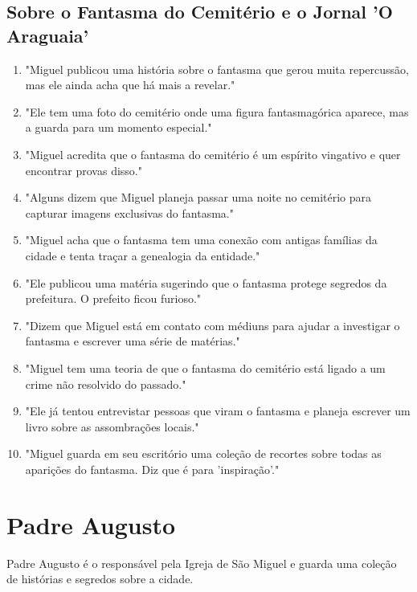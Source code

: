 \subsection*{Sobre o Fantasma do Cemitério e o Jornal 'O Araguaia'}
\begin{enumerate}
    \item "Miguel publicou uma história sobre o fantasma que gerou muita repercussão, mas ele ainda acha que há mais a revelar."
    \item "Ele tem uma foto do cemitério onde uma figura fantasmagórica aparece, mas a guarda para um momento especial."
    \item "Miguel acredita que o fantasma do cemitério é um espírito vingativo e quer encontrar provas disso."
    \item "Alguns dizem que Miguel planeja passar uma noite no cemitério para capturar imagens exclusivas do fantasma."
    \item "Miguel acha que o fantasma tem uma conexão com antigas famílias da cidade e tenta traçar a genealogia da entidade."
    \item "Ele publicou uma matéria sugerindo que o fantasma protege segredos da prefeitura. O prefeito ficou furioso."
    \item "Dizem que Miguel está em contato com médiuns para ajudar a investigar o fantasma e escrever uma série de matérias."
    \item "Miguel tem uma teoria de que o fantasma do cemitério está ligado a um crime não resolvido do passado."
    \item "Ele já tentou entrevistar pessoas que viram o fantasma e planeja escrever um livro sobre as assombrações locais."
    \item "Miguel guarda em seu escritório uma coleção de recortes sobre todas as aparições do fantasma. Diz que é para 'inspiração'."
\end{enumerate}

\section{Padre Augusto}
Padre Augusto é o responsável pela Igreja de São Miguel e guarda uma coleção de histórias e segredos sobre a cidade.

